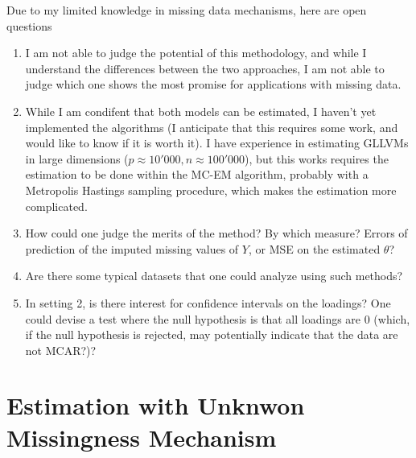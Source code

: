 \documentclass{article}
\begin{document}
Due to my limited knowledge in missing data mechanisms, here are open questions 
\begin{enumerate}
    \item I am not able to judge the potential of this methodology, and while I understand the differences between the two approaches, I am not able to judge which one shows the most promise for applications with missing data.
    \item While I am condifent that both models can be estimated, I haven't yet implemented the algorithms (I anticipate that this requires some work, and would like to know if it is worth it). I have experience in estimating GLLVMs in large dimensions ($p\approx 10'000, n\approx 100'000$), but this works requires the estimation to be done within the MC-EM algorithm, probably with a Metropolis Hastings sampling procedure, which makes the estimation more complicated.
    \item How could one judge the merits of the method? By which measure? Errors of prediction of the imputed missing values of $Y$, or MSE on the estimated $\theta$?
    \item Are there some typical datasets that one could analyze using such methods?
    \item In setting 2, is there interest for confidence intervals on the loadings? One could devise a test where the null hypothesis is that all loadings are 0 (which, if the null hypothesis is rejected, may potentially indicate that the data are not MCAR?)?
\end{enumerate}



\section{Estimation with Unknwon Missingness Mechanism}
\end{document}
